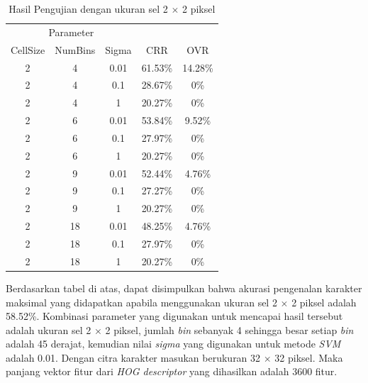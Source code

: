 \begin{longtable}[c]{|c|c|c|c|c|}
	\caption{Hasil Pengujian dengan ukuran sel 2 $\times$ 2 piksel}
	\label{tab:HasilPengujianSel2}\\
	\hline
	\multicolumn{3}{|c|}{Parameter} &                                &                                \\ \cline{1-3}
	CellSize   & NumBins   & Sigma  & \multirow{-2}{*}{CRR}          & \multirow{-2}{*}{OVR}          \\ \hline
	\endhead
	2          & 4         & 0.01   & {\color[HTML]{FE0000} 61.53\%} & {\color[HTML]{FE0000} 14.28\%} \\ \hline
	2          & 4         & 0.1    & 28.67\%                        & 0\%                            \\ \hline
	2          & 4         & 1      & 20.27\%                        & 0\%                            \\ \hline
	2          & 6         & 0.01   & 53.84\%                        & 9.52\%                         \\ \hline
	2          & 6         & 0.1    & 27.97\%                        & 0\%                            \\ \hline
	2          & 6         & 1      & 20.27\%                        & 0\%                            \\ \hline
	2          & 9         & 0.01   & 52.44\%                        & 4.76\%                         \\ \hline
	2          & 9         & 0.1    & 27.27\%                        & 0\%                            \\ \hline
	2          & 9         & 1      & 20.27\%                        & 0\%                            \\ \hline
	2          & 18        & 0.01   & 48.25\%                        & 4.76\%                         \\ \hline
	2          & 18        & 0.1    & 27.97\%                        & 0\%                            \\ \hline
	2          & 18        & 1      & 20.27\%                        & 0\%                            \\ \hline
\end{longtable}
\noindent Berdasarkan tabel di atas, dapat disimpulkan bahwa akurasi pengenalan karakter maksimal yang didapatkan apabila menggunakan ukuran sel 2 $\times$ 2 piksel adalah 58.52\%. Kombinasi parameter yang digunakan untuk mencapai hasil tersebut adalah ukuran sel 2 $\times$ 2 piksel, jumlah \textit{bin} sebanyak 4 sehingga besar setiap \textit{bin} adalah 45 derajat, kemudian nilai \textit{sigma} yang digunakan untuk metode \textit{SVM} adalah 0.01. Dengan citra karakter masukan berukuran 32 $\times$ 32 piksel. Maka panjang vektor fitur dari \textit{HOG descriptor} yang dihasilkan adalah 3600 fitur.

